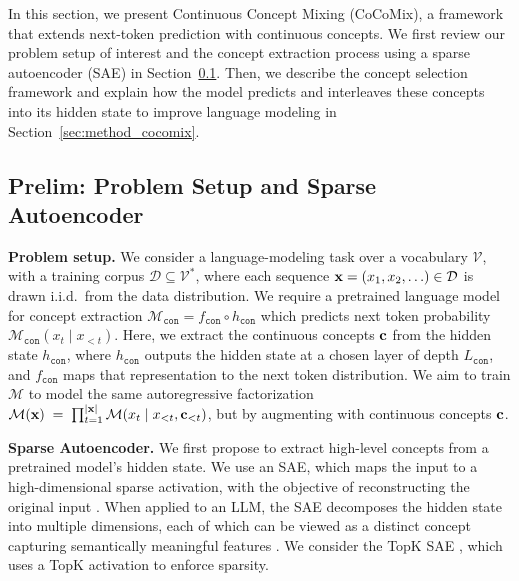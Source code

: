 \documentclass[]{fairmeta}
\newcommand{\mnamefirst}{Continuous Concept Mixing (CoCoMix)\xspace}
\begin{document}
In this section, we present \mnamefirst, a framework that extends next-token prediction with continuous concepts. We first review our problem setup of interest and the concept extraction process using a sparse autoencoder (SAE) in Section~\ref{sec:prelim}. Then, we describe the concept selection framework and explain how the model predicts and interleaves these concepts into its hidden state to improve language modeling in Section~\ref{sec:method_cocomix}.

\subsection{Prelim: Problem Setup and Sparse Autoencoder}
\label{sec:prelim}

\textbf{Problem setup.} 
We consider a language-modeling task over a vocabulary $\mathcal{V}$, with a training corpus $\mathcal{D} \subseteq \mathcal{V}^*$, where each sequence ${\mathbf{x}}=(x_{1},x_{2},\ldots)\in \mathcal{D}$ is drawn i.i.d.\ from the data distribution. We require a pretrained language model for concept extraction  $\mathcal{M}_\mathtt{con}=f_\mathtt{con}\circ h_\mathtt{con}$ which predicts next token probability $\mathcal{M}_\mathtt{con}(x_{t} \mid x_{<t})$. Here, we extract the continuous concepts ${\mathbf{c}}$ from the hidden state $h_\mathtt{con}$, where $h_\mathtt{con}$ outputs the hidden state at a chosen layer of depth $L_\mathtt{con}$, and $f_\mathtt{con}$ maps that representation to the next token distribution. We aim to train $\mathcal{M}$ to model the same autoregressive factorization $\mathcal{M}({\mathbf{x}}) \;=\; \prod_{t=1}^{|{\mathbf{x}}|} \mathcal{M}(x_{t} \mid x_{<t}, {\mathbf{c}}_{<t})$, but by augmenting with continuous concepts ${\mathbf{c}}$.

\textbf{Sparse Autoencoder.}
We first propose to extract high-level concepts from a pretrained model's hidden state. We use an SAE, which maps the input to a high-dimensional sparse activation, with the objective of reconstructing the original input \citep{lee2006efficient}. When applied to an LLM, the SAE decomposes the hidden state into multiple dimensions, each of which can be viewed as a distinct concept capturing semantically meaningful features \citep{yun2021transformer,bricken2023monosemanticity}. We consider the TopK SAE \citep{makhzani2014k}, which uses a TopK activation to enforce sparsity.
\end{document}
